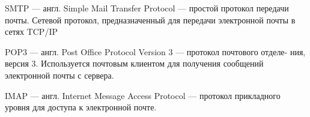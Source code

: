 \Abbreviations %
\begin{description}
\item{SMTP --- англ. Simple Mail Transfer Protocol ---  простой протокол передачи
почты. Сетевой протокол, предназначенный для передачи электронной почты в сетях TCP/IP}
\item{POP3 --- англ. Post Office Protocol Version 3 --- протокол почтового отделе-
ния, версия 3. Используется почтовым клиентом для получения сообщений электронной почты с сервера.}
\item{IMAP --- англ. Internet Message Access Protocol --- протокол прикладного уровня для доступа к электронной почте.}
\end{description}

